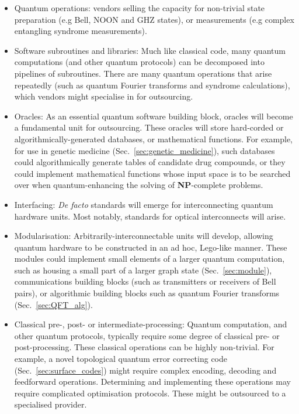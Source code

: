 \begin{itemize}
\item Quantum operations: vendors selling the capacity for non-trivial state preparation (e.g Bell, NOON and GHZ states), or measurements (e.g complex entangling syndrome measurements).

\item Software subroutines and libraries: Much like classical code, many quantum computations (and other quantum protocols) can be decomposed into pipelines of subroutines. There are many quantum operations that arise repeatedly (such as quantum Fourier transforms and syndrome calculations), which vendors might specialise in for outsourcing.

\item Oracles: As an essential quantum software building block, oracles will become a fundamental unit for outsourcing. These oracles will store hard-corded or algorithmically-generated databases, or mathematical functions. For example, for use in genetic medicine (Sec.~\ref{sec:genetic_medicine}), such databases could algorithmically generate tables of candidate drug compounds, or they could implement mathematical functions whose input space is to be searched over when quantum-enhancing the solving of \textbf{NP}-complete problems.

\item Interfacing: \textit{De facto} standards will emerge for interconnecting quantum hardware units. Most notably, standards for optical interconnects will arise.

\item Modularisation: Arbitrarily-interconnectable units will develop, allowing quantum hardware to be constructed in an ad hoc, Lego-like manner. These modules could implement small elements of a larger quantum computation, such as housing a small part of a larger graph state (Sec.~\ref{sec:module}), communications building blocks (such as transmitters or receivers of Bell pairs), or algorithmic building blocks such as quantum Fourier transforms (Sec.~\ref{sec:QFT_alg}).

\item Classical pre-, post- or intermediate-processing: Quantum computation, and other quantum protocols, typically require some degree of classical pre- or post-processing. These classical operations can be highly non-trivial. For example, a novel topological quantum error correcting code (Sec.~\ref{sec:surface_codes}) might require complex encoding, decoding and feedforward operations. Determining and implementing these operations may require complicated optimisation protocols. These might be outsourced to a specialised provider.


\end{itemize}
